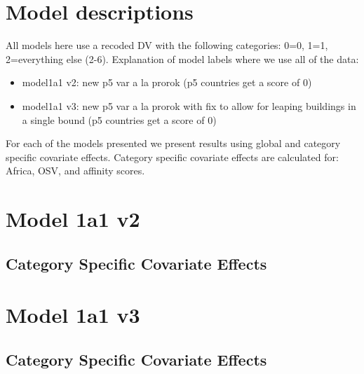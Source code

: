 \documentclass[]{article}
\begin{document}
\tableofcontents

\clearpage

\section*{Model descriptions}

All models here use a recoded DV with the following categories: 0=0, 1=1, 2=everything else (2-6). Explanation of model labels where we use all of the data:

\begin{itemize}
	\item model1a1 v2: new p5 var a la prorok (p5 countries get a score of 0)
	\item model1a1 v3: new p5 var a la prorok with fix to allow for leaping buildings in a single bound (p5 countries get a score of 0)
\end{itemize}

For each of the models presented we present results using global and category specific covariate effects. Category specific covariate effects are calculated for: Africa, OSV, and affinity scores.
\clearpage

\section{Model 1a1 v2}
\subsection{Category Specific Covariate Effects}

\clearpage

\section{Model 1a1 v3}
\subsection{Category Specific Covariate Effects}

\clearpage
\end{document}

